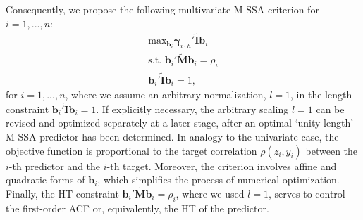 \documentclass[11pt,a4paper]{article}
\begin{document}
Consequently, we propose the following multivariate M-SSA criterion for $i=1,...,n$: 
\begin{eqnarray}\label{eq:mcrit1}
\textrm{max}_{\mathbf{b}_i}\boldsymbol{\gamma}_{i\cdot h}'\tilde{\mathbf{I}}\mathbf{b}_{i}\\
\textrm{s.t.~}\mathbf{b}_{i}'\tilde{\mathbf{M}}\mathbf{b}_{i}=\rho_i\nonumber\\
\mathbf{b}_{i}'\tilde{\mathbf{I}}\mathbf{b}_{i}=1,\nonumber
\end{eqnarray}
for $i=1,...,n$, where we assume an arbitrary normalization, $l=1$, in the length constraint $\mathbf{b}_{i}'\tilde{\mathbf{I}}\mathbf{b}_{i}=1$. If explicitly necessary, the arbitrary scaling $l=1$ can be revised and optimized separately at a later stage, after an optimal `unity-length' M-SSA predictor has been determined. In analogy to the univariate case, the objective function is proportional to the target correlation $\rho(z_i,y_i)$ between the $i$-th predictor and the $i$-th target. Moreover, the criterion involves affine and quadratic forms of $\mathbf{b}_i$, which simplifies the process of numerical optimization. Finally, the HT constraint $\mathbf{b}_{i}'\tilde{\mathbf{M}}\mathbf{b}_{i}=\rho_i$, where we used $l=1$, serves to control the first-order ACF or, equivalently, the HT of the predictor. 
\end{document}
